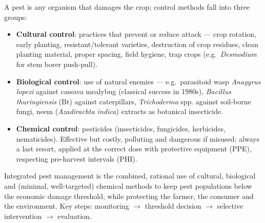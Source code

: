 \documentclass[11pt]{article}
\newcommand{\cle}[1]{{\popxbold\color{popdark}#1}}
\begin{document}
A \cle{pest} is any organism that damages the crop; control methods fall into three groups:

\begin{itemize}
\item \textbf{Cultural control}: practices that prevent or reduce attack — crop rotation, early planting, resistant/tolerant varieties, destruction of crop residues, clean planting material, proper spacing, field hygiene, trap crops (e.g.\ \emph{Desmodium} for stem borer push-pull).
\item \textbf{Biological control}: use of natural enemies — e.g.\ parasitoid wasp \emph{Anagyrus lopezi} against cassava mealybug (classical success in 1980s), \emph{Bacillus thuringiensis} (Bt) against caterpillars, \emph{Trichoderma} spp. against soil-borne fungi, neem (\emph{Azadirachta indica}) extracts as botanical insecticide.
\item \textbf{Chemical control}: pesticides (insecticides, fungicides, herbicides, nematicides). Effective but costly, polluting and dangerous if misused; always a last resort, applied at the correct dose with protective equipment (PPE), respecting pre-harvest intervals (PHI).
\end{itemize}

\begin{definition}
\cle{Integrated pest management} is the combined, rational use of cultural, biological and (minimal, well-targeted) chemical methods to keep pest populations below the economic damage threshold, while protecting the farmer, the consumer and the environment. Key steps: monitoring $\rightarrow$ threshold decision $\rightarrow$ selective intervention $\rightarrow$ evaluation.
\end{definition}
\end{document}
